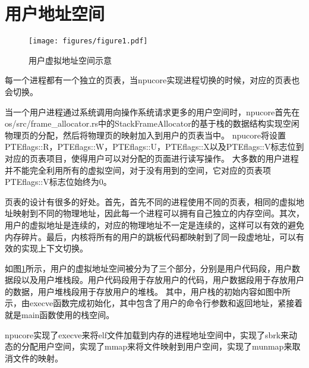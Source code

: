 \section{用户地址空间}
\begin{figure}[htb]
    \centering
    \texttt{[image: figures/figure1.pdf]}
    \caption{
        用户虚拟地址空间示意
    }
    \label{fig:user virtual process}
\end{figure}
每一个进程都有一个独立的页表，当npucore实现进程切换的时候，对应的页表也会切换。

当一个用户进程通过系统调用向操作系统请求更多的用户空间时，npucore首先在os/src/frame_allocator.rs中的StackFrameAllocator的基于栈的数据结构实现空闲物理页的分配，然后将物理页的映射加入到用户的页表当中。
npucore将设置PTEflags::R，PTEflags::W，PTEflags::U，PTEflags::X以及PTEflags::V标志位到对应的页表项目，使得用户可以对分配的页面进行读写操作。
大多数的用户进程并不能完全利用所有的虚拟空间，对于没有用到的空间，它对应的页表项PTEflags::V标志位始终为0。

页表的设计有很多的好处。首先，首先不同的进程使用不同的页表，相同的虚拟地址映射到不同的物理地址，因此每一个进程可以拥有自己独立的内存空间。其次，用户的虚拟地址是连续的，对应的物理地址不一定是连续的，这样可以有效的避免内存碎片。最后，内核将所有的用户的跳板代码都映射到了同一段虚地址，可以有效的实现上下文切换。

如图\ref{fig:user virtual process}所示，用户的虚拟地址空间被分为了三个部分，分别是用户代码段，用户数据段以及用户堆栈段。用户代码段用于存放用户的代码，用户数据段用于存放用户的数据，用户堆栈段用于存放用户的堆栈。
其中，用户栈的初始内容如图中所示，由execve函数完成初始化，其中包含了用户的命令行参数和返回地址，紧接着就是main函数使用的栈空间。

npucore实现了execve来将elf文件加载到内存的进程地址空间中，实现了sbrk来动态的分配用户空间，实现了mmap来将文件映射到用户空间，实现了munmap来取消文件的映射。

\subsection{}